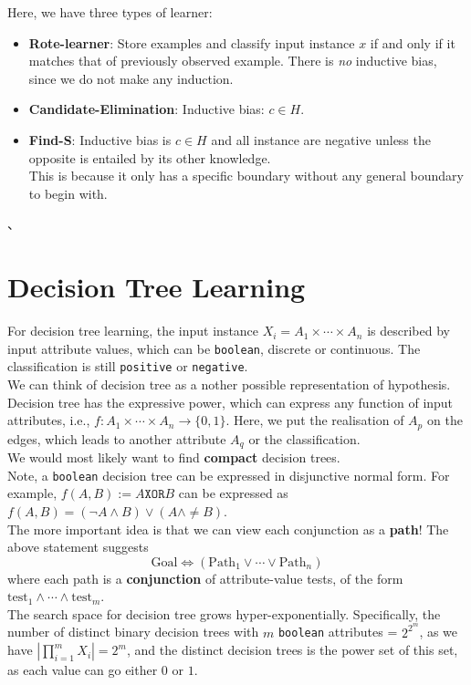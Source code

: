 \documentclass[12pt]{article}
\theoremstyle{definition}
\begin{document}
Here, we have three types of learner:
\begin{itemize}
	\item \textbf{Rote-learner}: Store examples and classify input instance $x$ if and only if it matches that of previously observed example. There is \textit{no} inductive bias, since we do not make any induction.
	\item \textbf{Candidate-Elimination}: Inductive bias: $c\in H$.
	\item \textbf{Find-S}: Inductive bias is $c\in H$ and all instance are negative unless the opposite is entailed by its other knowledge.\\
	This is because it only has a specific boundary without any general boundary to begin with.
\end{itemize}、
\section{Decision Tree Learning}
For decision tree learning, the input instance $X_i=A_1\times \cdots\times A_n$ is described by input attribute values, which can be \texttt{boolean}, discrete or continuous. The classification is still \texttt{positive} or \texttt{negative}.\\
We can think of decision tree as a nother possible representation of hypothesis.\\
Decision tree has the expressive power, which can express any function of input attributes, i.e., $f: A_1\times\cdots\times A_n\to \{0,1\}$. Here, we put the realisation of $A_p$ on the edges, which leads to another attribute $A_q$ or the classification.\\
We would most likely want to find \textbf{compact} decision trees.\\
Note, a \texttt{boolean} decision tree can be expressed in disjunctive normal form. For example, $f(A,B):=A \texttt{XOR} B$ can be expressed as $f(A,B)=(\neg A\land B)\lor (A\land \neq B)$.\\
The more important idea is that we can view each conjunction as a \textbf{path}! The above statement suggests
\[
\text{Goal} \Leftrightarrow (\text{Path}_1\lor\cdots\lor \text{Path}_n)
\]
where each path is a \textbf{conjunction} of attribute-value tests, of the form $\text{test}_1\land \cdots\land \text{test}_m$.\\
The search space for decision tree grows hyper-exponentially. Specifically, the number of distinct binary decision trees with $m$ \texttt{boolean} attributes = $2^{2^m}$, as we have $|\prod_{i=1}^m X_i|=2^m$, and the distinct decision trees is the power set of this set, as each value can go either $0$ or $1$.\\
\end{document}

